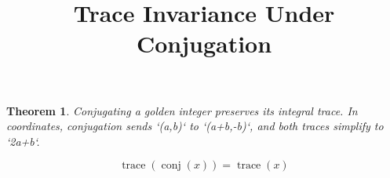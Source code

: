 \documentclass{article}
\title{Trace Invariance Under Conjugation}
\newtheorem{theorem}{Theorem}
\begin{document}
\maketitle
\begin{theorem}
Conjugating a golden integer preserves its integral trace. In coordinates, conjugation sends `(a,b)` to `(a+b,-b)`, and both traces simplify to `2a+b`.

$$\operatorname{trace}\left(\operatorname{conj}\left(x\right)\right) = \operatorname{trace}\left(x\right)$$
\end{theorem}
\end{document}
